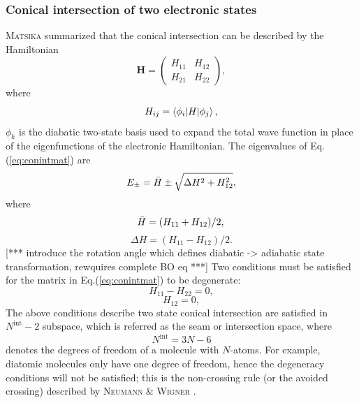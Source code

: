\documentclass[12pt]{article}
\def\att{                    %
        \marginpar[ \hspace*{\fill} \raisebox{-0.2em}{\rule{2mm}{1.2em}} ]
        {\raisebox{-0.2em}{\rule{2mm}{1.2em}} }
        }
\def\at#1{[*** \att #1 ***]}  %
\begin{document}
\subsubsection{Conical intersection of two electronic states}
\textsc{Matsika} \cite{idx182} summarized that the conical intersection can be described by the Hamiltonian
\begin{equation}
    \mathbf{H} = 
    \begin{pmatrix}
        H_{11} & H_{12} \\
        H_{21} & H_{22}
    \end{pmatrix},
    \label{eq:conintmat}
\end{equation}
where 
\begin{equation}
    H_{ij} = \braket{\phi_i|H|\phi_j},
\end{equation}
$\phi_k$ is the diabatic two-state basis used to expand the total wave function in place of the eigenfunctions of the electronic Hamiltonian. The eigenvalues of Eq.(\ref{eq:conintmat}) are
\begin{equation}
    E_{\pm} = \Bar{H} \pm \sqrt{\Delta H^2 + H_{12}^2},
\end{equation}
where
\begin{equation}
    \Bar{H} = (H_{11} + H_{12})/2, \\
\end{equation}
\begin{equation}
    \Delta H = (H_{11} - H_{12})/2.
\end{equation}
\at{introduce the rotation angle which defines diabatic -> adiabatic state transformation, rewquires complete BO eq}
Two conditions must be satisfied for the matrix in Eq.(\ref{eq:conintmat}) to be degenerate:
\begin{equation}
    H_{11} - H_{22} = 0,
\end{equation}
\begin{equation}
    H_{12} = 0,
\end{equation}
The above conditions describe two state conical intersection are satisfied in $N^\text{int}-2$ subspace, which is referred as the seam or intersection space, where
\begin{equation}
    N^\text{int} = 3N-6
\end{equation}
denotes the degrees of freedom of a molecule with $N$-atoms. For example, diatomic molecules only have one degree of freedom, hence the degeneracy conditions will not be satisfied; this is the non-crossing rule (or the avoided crossing) described by \textsc{Neumann \& Wigner} \cite{neumannwigner}.
\end{document}
